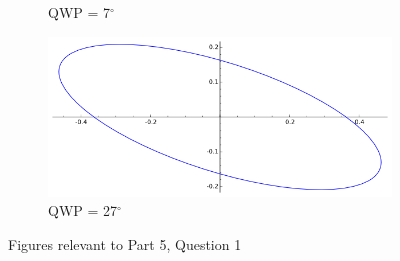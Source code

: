 \documentclass[10pt,a4paper]{article}
\begin{document}
\begin{figure}
\begin{subfigure}[b]{0.3\textwidth}
\caption{QWP = 7$^{\circ}$}
\end{subfigure}
\begin{subfigure}[b]{0.3\textwidth}
\centering
\includegraphics[width=\textwidth]{../Analysis/QWP27.png} 
\caption{QWP = 27$^{\circ}$}
\end{subfigure}
\caption{Figures relevant to Part 5, Question 1}
\end{figure}
\end{document}
